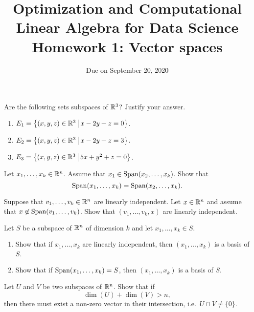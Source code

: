 \documentclass[11pt,nocut]{article}
\title{\vspace{-2.0cm}%
	Optimization and Computational Linear Algebra for Data Science\\
Homework 1: Vector spaces}
\date{\vspace{-1cm}Due on September 20, 2020}
\begin{document}
\maketitle


\begin{problem}[3 points]
	Are the following sets subspaces of $\mathbb{R}^3$? Justify your answer.
	\begin{enumerate}[label=\normalfont(\textbf{\alph*})]
		\item $E_1= \big\{ (x,y,z) \in \mathbb{R}^3 \, \big| \, x - 2y + z= 0 \big\}$.
		\item $E_2= \big\{ (x,y,z) \in \mathbb{R}^3 \, \big| \, x - 2y + z= 3 \big\}$.
		\item $E_3= \big\{ (x,y,z) \in \mathbb{R}^3 \, \big| \, 5x + y^2 + z= 0 \big\}$.
	\end{enumerate}
\end{problem}

\vspace{1mm}

\begin{problem}[2 points]\label{prob:rem_vector}
	Let $x_1, \dots, x_k \in \mathbb{R}^n$. Assume that $x_1 \in {{\rm Span}}(x_2, \dots, x_k)$. Show that
	$$
	{{\rm Span}}(x_1, \dots, x_k) = {{\rm Span}}(x_2, \dots, x_k).
	$$
\end{problem}

\vspace{1mm}

\begin{problem}[2 points]\label{prob:add_vector}
	Suppose that $v_1, \dots, v_k \in \mathbb{R}^n$ are linearly independent. Let $x \in \mathbb{R}^n$ and assume that $x \not\in {{\rm Span}}(v_1,\dots, v_k)$.
	Show that $(v_1,\dots,v_k,x)$ are linearly independent.
\end{problem}

\vspace{1mm}

\begin{problem}[3 points]
	Let $S$ be a subspace of $\mathbb{R}^n$ of dimension $k$ and let $x_1, \dots, x_k \in S$.
	\begin{enumerate}[label=\normalfont(\textbf{\alph*})]
		\item Show that if $x_1, \dots, x_k$ are linearly independent, then $(x_1, \dots, x_k)$ is a basis of $S$.
		\item Show that if ${{\rm Span}}(x_1, \dots, x_k) = S$, then $(x_1, \dots, x_k)$ is a basis of $S$.
	\end{enumerate}
\end{problem}

\vspace{1mm}

\begin{problem}[$\star$]
	Let $U$ and $V$ be two subspaces of $\mathbb{R}^n$. Show that if
	$$
	\dim(U) + \dim(V) > n,
	$$
	then there must exist a non-zero vector in their intersection, i.e.\ $U \cap V \neq \{0\}$.
\end{problem}
\vspace{1cm}
\centerline{}

%
%
\end{document}
